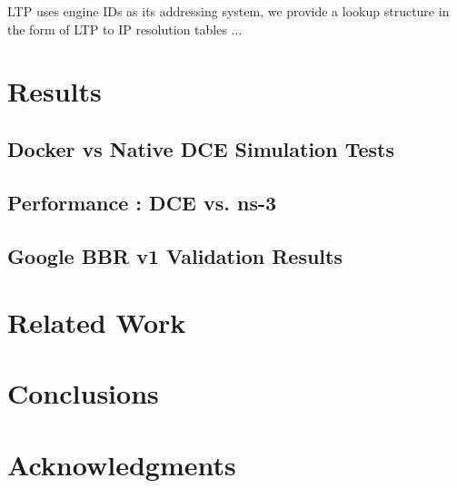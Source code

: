 \documentclass{sig-alternate}
\begin{document}
LTP uses engine IDs as its addressing system, we provide a lookup structure in the form of LTP to IP resolution tables ...


\section{Results}

\subsection{Docker vs Native DCE Simulation Tests}

\subsection{Performance : DCE vs. ns-3}

\subsection{Google BBR v1 Validation Results}

\section{Related Work}

\section{Conclusions}

\section{Acknowledgments}
%

%
%
\end{document}
